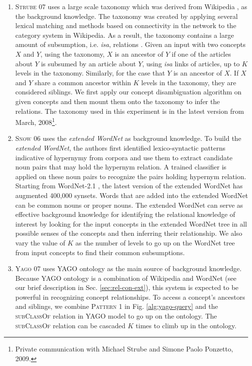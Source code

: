 \begin{enumerate}

\item \textsc{Strube 07} uses a large scale taxonomy which was derived
  from Wikipedia \cite{wikitaxo07}, as the background knowledge. The
  taxonomy was created by applying several lexical matching and
  methods based on connectivity in the network to the category system
  in Wikipedia. As a result, the taxonomy contains a large amount of
  subsumption, i.e. {\em isa}, relations \cite{wikitaxo07}. Given an
  input with two concepts $X$ and $Y$, using the taxonomy, $X$ is an
  ancestor of $Y$ if one of the articles about $Y$ is subsumed by an
  article about $Y$, using {\em isa} links of articles, up to $K$
  levels in the taxonomy.  Similarly, for the case that $Y$ is an
  ancestor of $X$. If $X$ and $Y$ share a common ancestor within $K$
  levels in the taxonomy, they are considered siblings. We first apply
  our concept disambiguation algorithm on given concepts and then
  mount them onto the taxonomy to infer the relations. The taxonomy
  used in this experiment is in the latest version from March,
  2008\footnote{Private communication with Michael Strube and Simone
    Paolo Ponzetto, 2009.}.

\item \textsc{Snow 06} uses the {\em extended WordNet}
  \cite{ilprints665,Snow2006} as background knowledge. To build the
  {\em extended WordNet}, the authors first identified
  lexico-syntactic patterns indicative of hypernymy from
  corpora and use them to extract candidate noun pairs
  that may hold the hypernym relation. A trained classifier is applied
  on these noun pairs to recognize the pairs holding hypernym
  relation. Starting from WordNet-2.1 \cite{Fellbaum98}, the latest
  version of the extended WordNet has augmented 400,000 synsets. Words
  that are added into the extended WordNet can be common nouns or
  proper nouns. The extended WordNet can serve as effective background
  knowledge for identifying the relational knowledge of interest by
  looking for the input concepts in the extended WordNet tree in all
  possible senses of the concepts and then inferring their
  relationship. We also vary the value of $K$ as the number of levels
  to go up on the WordNet tree from input concepts to find their
  common subsumptions.

\item \textsc{Yago 07} uses YAGO ontology \cite{suchanek2007WWW} as
  the main source of background knowledge. Because YAGO ontology is a
  combination of Wikipedia and WordNet (see our brief description in
  Sec. \ref{sec:rel-con-ext}), this system is expected to be powerful
  in recognizing concept relationships. To access a concept's
  ancestors and siblings, we combine \textsc{Pattern 1} in
  Fig. \ref{alg:yago-query} and the \textsc{subClassOf} relation in
  YAGO model to go up on the ontology. The \textsc{subClassOf}
  relation can be cascaded $K$ times to climb up in the ontology.

\end{enumerate}

